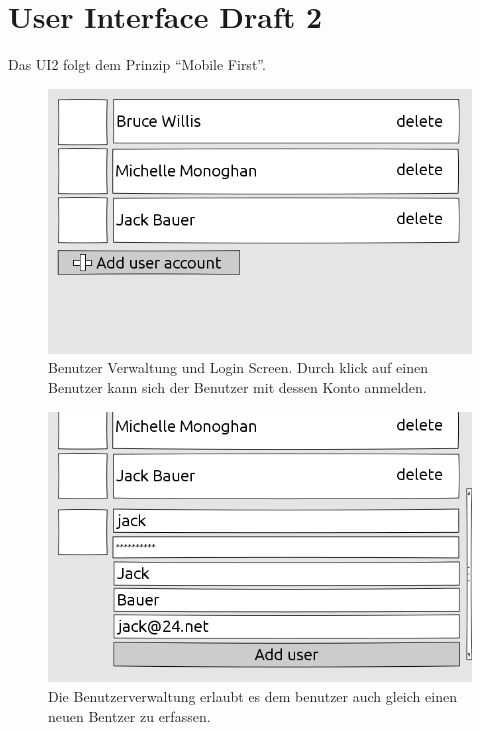 \section{User Interface Draft 2}
	Das UI2 folgt dem Prinzip "`Mobile First"'.
	\begin{figure}[H]
		\centering
		\includegraphics[height=0.35\textheight]{../ui/img/uiDraft2/UserView-selectUser.png}
		\caption{Benutzer Verwaltung und Login Screen. Durch klick auf einen Benutzer kann sich der Benutzer mit dessen Konto anmelden.}
		\label{login screen}
	\end{figure}
	\begin{figure}[H]
		\centering
		\includegraphics[height=0.35\textheight]{../ui/img/uiDraft2/UserView-addUser.png}
		\caption{Die Benutzerverwaltung erlaubt es dem benutzer auch gleich einen neuen Bentzer zu erfassen.}
		\label{user management screen}
	\end{figure}
